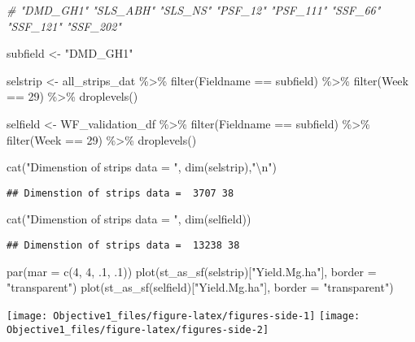 \documentclass[
]{article}
\newenvironment{Shaded}{\begin{snugshade}}{\end{snugshade}}
\newcommand{\AttributeTok}[1]{\textcolor[rgb]{0.77,0.63,0.00}{#1}}
\newcommand{\CommentTok}[1]{\textcolor[rgb]{0.56,0.35,0.01}{\textit{#1}}}
\newcommand{\DecValTok}[1]{\textcolor[rgb]{0.00,0.00,0.81}{#1}}
\newcommand{\FunctionTok}[1]{\textcolor[rgb]{0.00,0.00,0.00}{#1}}
\newcommand{\NormalTok}[1]{#1}
\newcommand{\OtherTok}[1]{\textcolor[rgb]{0.56,0.35,0.01}{#1}}
\newcommand{\SpecialCharTok}[1]{\textcolor[rgb]{0.00,0.00,0.00}{#1}}
\newcommand{\StringTok}[1]{\textcolor[rgb]{0.31,0.60,0.02}{#1}}
\begin{document}
\begin{Shaded}
\begin{Highlighting}[]
\CommentTok{\# "DMD\_GH1" "SLS\_ABH" "SLS\_NS"  "PSF\_12"  "PSF\_111" "SSF\_66"  "SSF\_121" "SSF\_202"}

\NormalTok{subfield }\OtherTok{\textless{}{-}} \StringTok{"DMD\_GH1"}

\NormalTok{selstrip }\OtherTok{\textless{}{-}}\NormalTok{ all\_strips\_dat }\SpecialCharTok{\%\textgreater{}\%} 
  \FunctionTok{filter}\NormalTok{(Fieldname }\SpecialCharTok{==}\NormalTok{ subfield) }\SpecialCharTok{\%\textgreater{}\%} 
  \FunctionTok{filter}\NormalTok{(Week }\SpecialCharTok{==} \DecValTok{29}\NormalTok{) }\SpecialCharTok{\%\textgreater{}\%} 
  \FunctionTok{droplevels}\NormalTok{()}

\NormalTok{selfield }\OtherTok{\textless{}{-}}\NormalTok{ WF\_validation\_df }\SpecialCharTok{\%\textgreater{}\%} 
  \FunctionTok{filter}\NormalTok{(Fieldname }\SpecialCharTok{==}\NormalTok{ subfield) }\SpecialCharTok{\%\textgreater{}\%} 
  \FunctionTok{filter}\NormalTok{(Week }\SpecialCharTok{==} \DecValTok{29}\NormalTok{) }\SpecialCharTok{\%\textgreater{}\%} 
  \FunctionTok{droplevels}\NormalTok{()}

\FunctionTok{cat}\NormalTok{(}\StringTok{"Dimenstion of strips data = "}\NormalTok{, }\FunctionTok{dim}\NormalTok{(selstrip),}\StringTok{"}\SpecialCharTok{\textbackslash{}n}\StringTok{"}\NormalTok{)}
\end{Highlighting}
\end{Shaded}

\begin{verbatim}
## Dimenstion of strips data =  3707 38
\end{verbatim}

\begin{Shaded}
\begin{Highlighting}[]
\FunctionTok{cat}\NormalTok{(}\StringTok{"Dimenstion of strips data = "}\NormalTok{, }\FunctionTok{dim}\NormalTok{(selfield))}
\end{Highlighting}
\end{Shaded}

\begin{verbatim}
## Dimenstion of strips data =  13238 38
\end{verbatim}

\begin{Shaded}
\begin{Highlighting}[]
\FunctionTok{par}\NormalTok{(}\AttributeTok{mar =} \FunctionTok{c}\NormalTok{(}\DecValTok{4}\NormalTok{, }\DecValTok{4}\NormalTok{, .}\DecValTok{1}\NormalTok{, .}\DecValTok{1}\NormalTok{))}
\FunctionTok{plot}\NormalTok{(}\FunctionTok{st\_as\_sf}\NormalTok{(selstrip)[}\StringTok{"Yield.Mg.ha"}\NormalTok{], }\AttributeTok{border =} \StringTok{"transparent"}\NormalTok{)}
\FunctionTok{plot}\NormalTok{(}\FunctionTok{st\_as\_sf}\NormalTok{(selfield)[}\StringTok{"Yield.Mg.ha"}\NormalTok{], }\AttributeTok{border =} \StringTok{"transparent"}\NormalTok{)}
\end{Highlighting}
\end{Shaded}

\texttt{[image: Objective1\_files/figure-latex/figures-side-1]}
\texttt{[image: Objective1\_files/figure-latex/figures-side-2]}
\end{document}
